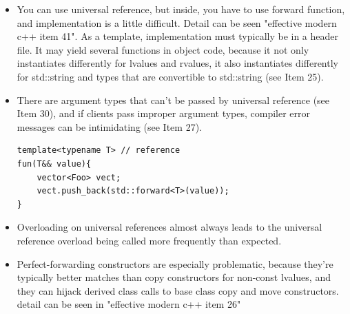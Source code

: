 \documentclass[a4paper,11pt,twoside]{book}
\begin{document}
\begin{itemize}
\item You can use universal reference,  but inside, you have to use forward function, and implementation is a little difficult.  Detail can be seen "effective modern c++ item 41". As a template, implementation must typically be in a header file. It may yield several functions in object code, because it not only instantiates differently for lvalues and rvalues, it also instantiates differently for std::string and types that are convertible to std::string (see Item 25). 

\item There are argument types that can't be passed by universal reference (see Item 30), and if clients pass improper argument types, compiler error messages can be intimidating (see Item 27).

\begin{lstlisting}[numbers=none]
template<typename T> // reference
fun(T&& value){
	vector<Foo> vect;
	vect.push_back(std::forward<T>(value)); 
}
\end{lstlisting}


\item Overloading on universal references almost always leads to the universal reference overload being called more frequently than expected.

\item Perfect-forwarding constructors are especially problematic, because they're typically better matches than copy constructors for non-const lvalues, and they can hijack derived class calls to base class copy and move constructors. detail can be seen in "effective modern c++ item 26"

\end{itemize}
\end{document}
